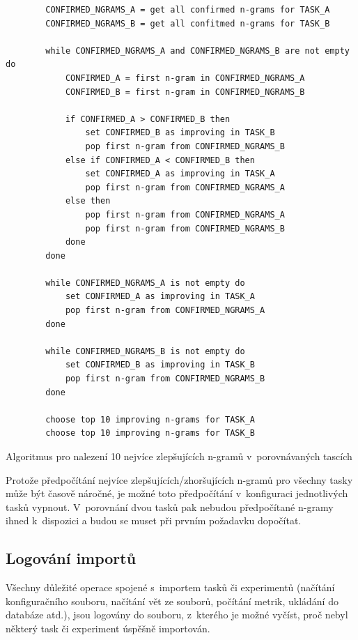 \begin{algorithm}
	\begin{verbatim}
		CONFIRMED_NGRAMS_A = get all confirmed n-grams for TASK_A
		CONFIRMED_NGRAMS_B = get all confitmed n-grams for TASK_B

		while CONFIRMED_NGRAMS_A and CONFIRMED_NGRAMS_B are not empty do
		    CONFIRMED_A = first n-gram in CONFIRMED_NGRAMS_A
		    CONFIRMED_B = first n-gram in CONFIRMED_NGRAMS_B

		    if CONFIRMED_A > CONFIRMED_B then
		        set CONFIRMED_B as improving in TASK_B
		        pop first n-gram from CONFIRMED_NGRAMS_B
		    else if CONFIRMED_A < CONFIRMED_B then
		        set CONFIRMED_A as improving in TASK_A
		        pop first n-gram from CONFIRMED_NGRAMS_A
		    else then
		        pop first n-gram from CONFIRMED_NGRAMS_A
		        pop first n-gram from CONFIRMED_NGRAMS_B
		    done
		done

		while CONFIRMED_NGRAMS_A is not empty do
		    set CONFIRMED_A as improving in TASK_A
		    pop first n-gram from CONFIRMED_NGRAMS_A
		done

		while CONFIRMED_NGRAMS_B is not empty do
		    set CONFIRMED_B as improving in TASK_B
		    pop first n-gram from CONFIRMED_NGRAMS_B
		done

		choose top 10 improving n-grams for TASK_A
		choose top 10 improving n-grams for TASK_B
	\end{verbatim}

	\caption{Algoritmus pro nalezení 10 nejvíce zlepšujících \mbox{n-gramů} v~porovnávaných tascích}
	\label{alg:improving}
\end{algorithm}



Protože předpočítání nejvíce zlepšujících/zhoršujících \mbox{n-gramů} pro všechny tasky může být časově náročné,
  je možné toto předpočítání v~konfiguraci jednotlivých tasků vypnout.
V~porovnání dvou tasků pak nebudou předpočítané \mbox{n-gramy} ihned k~dispozici
  a budou se muset při prvním požadavku dopočítat. 

\subsection{Logování importů}
Všechny důležité operace spojené s~importem tasků či experimentů
  (načítání konfiguračního souboru, načítání vět ze souborů,
  počítání metrik, ukládání do databáze atd.), 
  jsou logovány do souboru,
  z~kterého je možné vyčíst,
  proč nebyl některý task či experiment úspěšně importován. 


